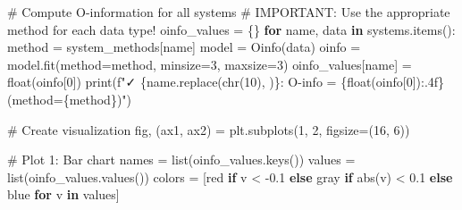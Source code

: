 \documentclass[
  11pt,
  letterpaper,
  oneside,
  openany]{book}
\newenvironment{Shaded}{\begin{snugshade}}{\end{snugshade}}
\newcommand{\BuiltInTok}[1]{\textcolor[rgb]{0.00,0.23,0.31}{#1}}
\newcommand{\CommentTok}[1]{\textcolor[rgb]{0.37,0.37,0.37}{#1}}
\newcommand{\ControlFlowTok}[1]{\textcolor[rgb]{0.00,0.23,0.31}{\textbf{#1}}}
\newcommand{\DecValTok}[1]{\textcolor[rgb]{0.68,0.00,0.00}{#1}}
\newcommand{\FloatTok}[1]{\textcolor[rgb]{0.68,0.00,0.00}{#1}}
\newcommand{\KeywordTok}[1]{\textcolor[rgb]{0.00,0.23,0.31}{\textbf{#1}}}
\newcommand{\NormalTok}[1]{\textcolor[rgb]{0.00,0.23,0.31}{#1}}
\newcommand{\OperatorTok}[1]{\textcolor[rgb]{0.37,0.37,0.37}{#1}}
\newcommand{\SpecialCharTok}[1]{\textcolor[rgb]{0.37,0.37,0.37}{#1}}
\newcommand{\SpecialStringTok}[1]{\textcolor[rgb]{0.13,0.47,0.30}{#1}}
\newcommand{\StringTok}[1]{\textcolor[rgb]{0.13,0.47,0.30}{#1}}
\begin{document}
\begin{Shaded}
\begin{Highlighting}[]
\CommentTok{\# Compute O{-}information for all systems}
\CommentTok{\# IMPORTANT: Use the appropriate method for each data type!}
\NormalTok{oinfo\_values }\OperatorTok{=}\NormalTok{ \{\}}
\ControlFlowTok{for}\NormalTok{ name, data }\KeywordTok{in}\NormalTok{ systems.items():}
\NormalTok{    method }\OperatorTok{=}\NormalTok{ system\_methods[name]}
\NormalTok{    model }\OperatorTok{=}\NormalTok{ Oinfo(data)}
\NormalTok{    oinfo }\OperatorTok{=}\NormalTok{ model.fit(method}\OperatorTok{=}\NormalTok{method, minsize}\OperatorTok{=}\DecValTok{3}\NormalTok{, maxsize}\OperatorTok{=}\DecValTok{3}\NormalTok{)}
\NormalTok{    oinfo\_values[name] }\OperatorTok{=} \BuiltInTok{float}\NormalTok{(oinfo[}\DecValTok{0}\NormalTok{])}
    \BuiltInTok{print}\NormalTok{(}\SpecialStringTok{f"✓ }\SpecialCharTok{\{}\NormalTok{name}\SpecialCharTok{.}\NormalTok{replace(}\BuiltInTok{chr}\NormalTok{(}\DecValTok{10}\NormalTok{), }\StringTok{\textquotesingle{} \textquotesingle{}}\NormalTok{)}\SpecialCharTok{\}}\SpecialStringTok{: O{-}info = }\SpecialCharTok{\{}\BuiltInTok{float}\NormalTok{(oinfo[}\DecValTok{0}\NormalTok{])}\SpecialCharTok{:.4f\}}\SpecialStringTok{ (method=}\SpecialCharTok{\{}\NormalTok{method}\SpecialCharTok{\}}\SpecialStringTok{)"}\NormalTok{)}

\CommentTok{\# Create visualization}
\NormalTok{fig, (ax1, ax2) }\OperatorTok{=}\NormalTok{ plt.subplots(}\DecValTok{1}\NormalTok{, }\DecValTok{2}\NormalTok{, figsize}\OperatorTok{=}\NormalTok{(}\DecValTok{16}\NormalTok{, }\DecValTok{6}\NormalTok{))}

\CommentTok{\# Plot 1: Bar chart}
\NormalTok{names }\OperatorTok{=} \BuiltInTok{list}\NormalTok{(oinfo\_values.keys())}
\NormalTok{values }\OperatorTok{=} \BuiltInTok{list}\NormalTok{(oinfo\_values.values())}
\NormalTok{colors }\OperatorTok{=}\NormalTok{ [}\StringTok{\textquotesingle{}red\textquotesingle{}} \ControlFlowTok{if}\NormalTok{ v }\OperatorTok{\textless{}} \OperatorTok{{-}}\FloatTok{0.1} \ControlFlowTok{else} \StringTok{\textquotesingle{}gray\textquotesingle{}} \ControlFlowTok{if} \BuiltInTok{abs}\NormalTok{(v) }\OperatorTok{\textless{}} \FloatTok{0.1} \ControlFlowTok{else} \StringTok{\textquotesingle{}blue\textquotesingle{}} \ControlFlowTok{for}\NormalTok{ v }\KeywordTok{in}\NormalTok{ values]}


\end{Highlighting}
\end{Shaded}
\end{document}
